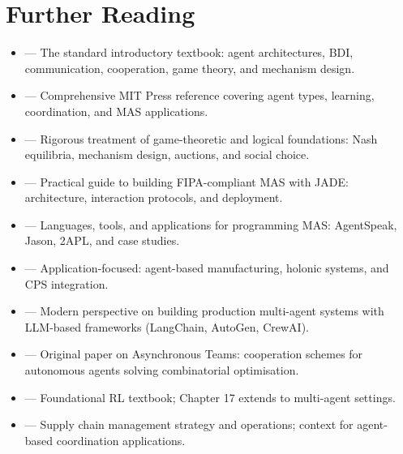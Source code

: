 \section{Further Reading}

\begin{itemize}
    \item {} --- The standard introductory textbook: agent architectures, BDI, communication, cooperation, game theory, and mechanism design.
    \item {} --- Comprehensive MIT Press reference covering agent types, learning, coordination, and MAS applications.
    \item {} --- Rigorous treatment of game-theoretic and logical foundations: Nash equilibria, mechanism design, auctions, and social choice.
    \item {} --- Practical guide to building FIPA-compliant MAS with JADE: architecture, interaction protocols, and deployment.
    \item {} --- Languages, tools, and applications for programming MAS: AgentSpeak, Jason, 2APL, and case studies.
    \item {} --- Application-focused: agent-based manufacturing, holonic systems, and CPS integration.
    \item {} --- Modern perspective on building production multi-agent systems with LLM-based frameworks (LangChain, AutoGen, CrewAI).
    \item {} --- Original paper on Asynchronous Teams: cooperation schemes for autonomous agents solving combinatorial optimisation.
    \item {} --- Foundational RL textbook; Chapter 17 extends to multi-agent settings.
    \item {} --- Supply chain management strategy and operations; context for agent-based coordination applications.
\end{itemize}
